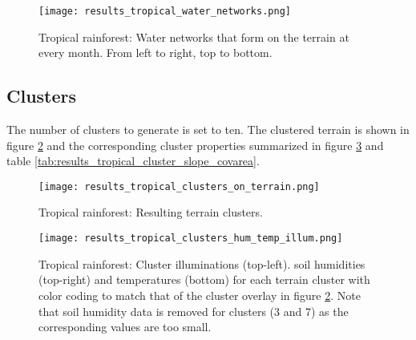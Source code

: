 \begin{figure}
\center
	\texttt{[image: results\_tropical\_water\_networks.png]}
	\caption{ Tropical rainforest: Water networks that form on the terrain at every month. From left to right, top to bottom.}
	\label{fig:results_tropical_water_networks}
\end{figure}

\subsection{Clusters}

The number of clusters to generate is set to ten. The clustered terrain is shown in figure \ref{fig:results_tropical_terrain_clusters} and the corresponding cluster properties summarized in figure \ref{fig:results_tropical_cluster_hum_temp_illum} and table \ref{tab:results_tropical_cluster_slope_covarea}.

\begin{figure}
\center
	\texttt{[image: results\_tropical\_clusters\_on\_terrain.png]}
	\caption{ Tropical rainforest: Resulting terrain clusters.}
	\label{fig:results_tropical_terrain_clusters}
\end{figure}

\begin{figure}
\center
	\texttt{[image: results\_tropical\_clusters\_hum\_temp\_illum.png]}
	\caption{ Tropical rainforest: Cluster illuminations (top-left). soil humidities (top-right) and temperatures (bottom) for each terrain cluster with color coding to match that of the cluster overlay in figure \ref{fig:results_tropical_terrain_clusters}. Note that soil humidity data is removed for clusters (3 and 7) as the corresponding values are too small.}
	\label{fig:results_tropical_cluster_hum_temp_illum}
\end{figure}


